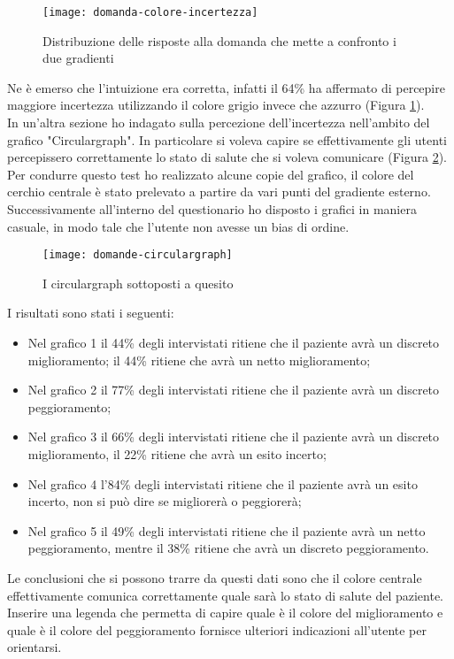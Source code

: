 \begin{figure}[!ht] 
    \centering 
    \texttt{[image: domanda-colore-incertezza]}
    \caption{Distribuzione delle risposte alla domanda che mette a confronto i due gradienti}
    \label{fig:domanda-colore-incertezza}
\end{figure}

Ne è emerso che l'intuizione era corretta, infatti il 64\% ha affermato di percepire maggiore incertezza utilizzando il colore grigio invece che azzurro (Figura \ref{fig:domanda-colore-incertezza}). \\

In un'altra sezione ho indagato sulla percezione dell'incertezza nell'ambito del grafico "Circulargraph". In particolare si voleva capire se effettivamente gli utenti percepissero correttamente lo stato di salute che si voleva comunicare (Figura \ref{fig:domande-circulargraph}). Per condurre questo test ho realizzato alcune copie del grafico, il colore del cerchio centrale è stato prelevato a partire da vari punti del gradiente esterno. Successivamente all'interno del questionario ho disposto i grafici in maniera casuale, in modo tale che l'utente non avesse un bias di ordine. \\

\begin{figure}[!ht] 
    \centering 
    \texttt{[image: domande-circulargraph]}
    \caption{I circulargraph sottoposti a quesito}
    \label{fig:domande-circulargraph}
\end{figure}

I risultati sono stati i seguenti:
\begin{itemize}
    \item Nel grafico 1 il 44\% degli intervistati ritiene che il paziente avrà un discreto miglioramento; il 44\% ritiene che avrà un netto miglioramento;
    \item Nel grafico 2 il 77\% degli intervistati ritiene che il paziente avrà un discreto peggioramento;
    \item Nel grafico 3 il 66\% degli intervistati ritiene che il paziente avrà un discreto miglioramento, il 22\% ritiene che avrà un esito incerto;
    \item Nel grafico 4 l'84\% degli intervistati ritiene che il paziente avrà un esito incerto, non si può dire se migliorerà o peggiorerà;
    \item Nel grafico 5 il 49\% degli intervistati ritiene che il paziente avrà un netto peggioramento, mentre il 38\% ritiene che avrà un discreto peggioramento.
\end{itemize}
Le conclusioni che si possono trarre da questi dati sono che il colore centrale effettivamente comunica correttamente quale sarà lo stato di salute del paziente. Inserire una legenda che permetta di capire quale è il colore del miglioramento e quale è il colore del peggioramento fornisce ulteriori indicazioni all'utente per orientarsi. \\

